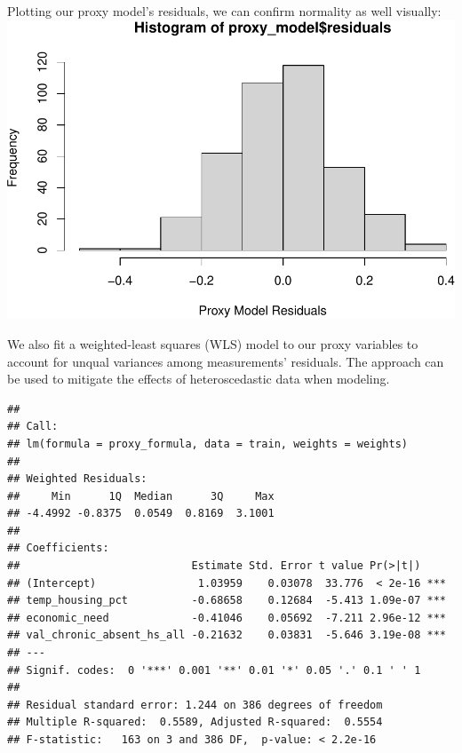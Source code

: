 \documentclass[
  man,floatsintext]{apa6}
\begin{document}
Plotting our proxy model's residuals, we can confirm normality as well visually:
\includegraphics{final-project_files/figure-latex/proxy-residual-plot-1.pdf}

We also fit a weighted-least squares (WLS) model to our proxy variables to account for unqual variances among measurements' residuals. The approach can be used to mitigate the effects of heteroscedastic data when modeling.

\begin{verbatim}
## 
## Call:
## lm(formula = proxy_formula, data = train, weights = weights)
## 
## Weighted Residuals:
##     Min      1Q  Median      3Q     Max 
## -4.4992 -0.8375  0.0549  0.8169  3.1001 
## 
## Coefficients:
##                           Estimate Std. Error t value Pr(>|t|)    
## (Intercept)                1.03959    0.03078  33.776  < 2e-16 ***
## temp_housing_pct          -0.68658    0.12684  -5.413 1.09e-07 ***
## economic_need             -0.41046    0.05692  -7.211 2.96e-12 ***
## val_chronic_absent_hs_all -0.21632    0.03831  -5.646 3.19e-08 ***
## ---
## Signif. codes:  0 '***' 0.001 '**' 0.01 '*' 0.05 '.' 0.1 ' ' 1
## 
## Residual standard error: 1.244 on 386 degrees of freedom
## Multiple R-squared:  0.5589, Adjusted R-squared:  0.5554 
## F-statistic:   163 on 3 and 386 DF,  p-value: < 2.2e-16
\end{verbatim}
\end{document}
